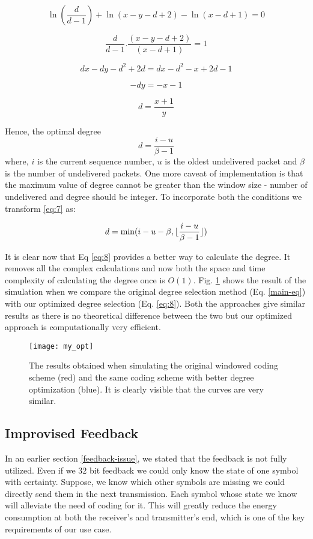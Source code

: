 \[
\ln({\frac{d}{d-1}}) + \ln(x-y-d+2) - \ln(x-d+1) = 0	
\]

\[
\frac{d}{d-1}. \frac{(x-y-d+2)}{(x-d+1)} = 1	
\]

\[
dx - dy - d^2 + 2d = dx - d^2 -x + 2d - 1
\]

\[
-dy = -x - 1
\]

\begin{equation} \label{eq:6}
	d = \frac{x+1}{y}
\end{equation}

Hence, the optimal degree
\begin{equation} \label{eq:7}
	d = \frac{i-u}{\beta - 1}
\end{equation}
where,
$i$ is the current sequence number, $u$ is the oldest undelivered packet and $\beta$ is the number of undelivered packets. One more caveat of implementation is that the maximum value of degree cannot be greater than the window size - number of undelivered and degree should be integer. To incorporate both the conditions we transform \ref{eq:7} as:

\begin{equation} \label{eq:8}
	d = \min (i-u-\beta, \lfloor\frac{i-u}{\beta - 1}\rfloor)
\end{equation}

It is clear now that Eq \ref{eq:8} provides a better way to calculate the degree. It removes all the complex calculations and now both the space and time complexity of calculating the degree once is $O(1)$. Fig. \ref{opt-degree-fig} shows the result of the simulation when we compare the original degree selection method (Eq. \ref{main-eq}) with our optimized degree selection (Eq. \ref{eq:8}). Both the approaches give similar results as there is no theoretical difference between the two but our optimized approach is computationally very efficient.

\begin{figure}[t]
	\centering
	\texttt{[image: my\_opt]}
	\caption{The results obtained when simulating the original windowed coding scheme (red) and the same coding scheme with better degree optimization (blue). It is clearly visible that the curves are very similar.}
	\label{opt-degree-fig}
\end{figure}


\subsection{Improvised Feedback}
In an earlier section \ref{feedback-issue}, we stated that the feedback is not fully utilized. Even if we $32$ bit feedback we could only know the state of one symbol with certainty. Suppose, we know which other symbols are missing we could directly send them in the next transmission. Each symbol whose state we know will alleviate the need of coding for it. This will greatly reduce the energy consumption at both the receiver's and transmitter's end, which is one of the key requirements of our use case.

